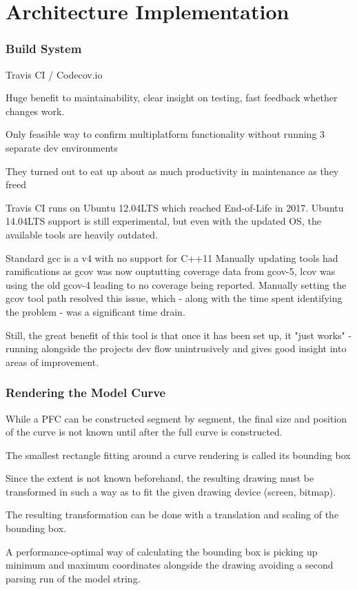 \chapter{Architecture Implementation}

\subsection{Build System}
Travis CI / Codecov.io

Huge benefit to maintainability, clear insight on testing, fast feedback whether changes work.

Only feasible way to confirm multiplatform functionality without running 3 separate dev environments

They turned out to eat up about as much productivity in maintenance as they freed

Travis CI runs on Ubuntu 12.04LTS which reached End-of-Life in 2017. Ubuntu 14.04LTS support is still experimental, but even with the updated OS, the available tools are heavily outdated.

Standard gcc is a v4 with no support for C++11
Manually updating tools had ramifications as gcov was now ouptutting coverage data from gcov-5, lcov was using the old gcov-4 leading to no coverage being reported. Manually setting the gcov tool path resolved this issue, which - along with the time spent identifying the problem - was a significant time drain.

Still, the great benefit of this tool is that once it has been set up, it "just works" - running alongside the projects dev flow unintrusively and gives good insight into areas of improvement.

\subsection{Rendering the Model Curve}
While a PFC can be constructed segment by segment, the final size and position of the curve is not known until after the full curve is constructed.

The smallest rectangle fitting around a curve rendering is called its  \gls{bounding box}

Since the extent is not known beforehand, the resulting drawing must be transformed in such a way as to fit the given drawing device (screen, bitmap).

The resulting transformation can be done with a translation and scaling of the bounding box.

A performance-optimal way of calculating the bounding box is picking up minimum and maximum coordinates alongside the drawing avoiding a second parsing run of the model string.

